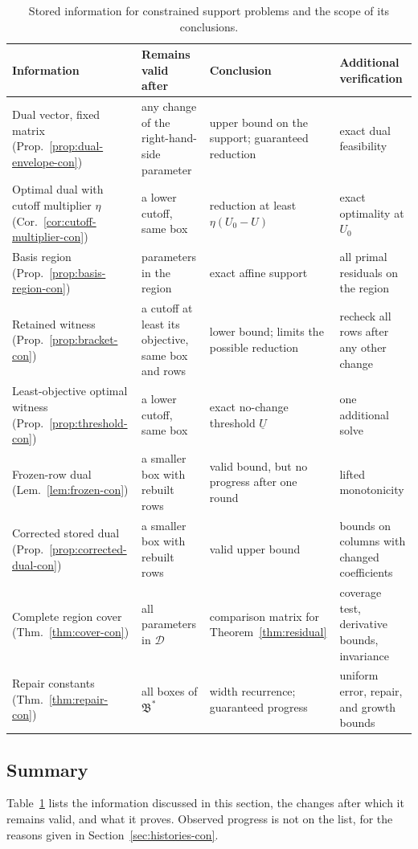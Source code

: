 \begin{table}[tbp]
\centering
\small
\caption{Stored information for constrained support problems and the scope
of its conclusions.}\label{tab:scope-con}
\begin{tabular}{@{}>{\raggedright\arraybackslash}p{}%
>{\raggedright\arraybackslash}p{}%
>{\raggedright\arraybackslash}p{}%
>{\raggedright\arraybackslash}p{}@{}}
\toprule
Information & Remains valid after & Conclusion & Additional verification\\
\midrule
Dual vector, fixed matrix (Prop.~\ref{prop:dual-envelope-con}) &
 any change of the right-hand-side parameter &
 upper bound on the support; guaranteed reduction &
 exact dual feasibility\\
Optimal dual with cutoff multiplier $\eta$ (Cor.~\ref{cor:cutoff-multiplier-con}) &
 a lower cutoff, same box &
 reduction at least $\eta(U_0-U)$ &
 exact optimality at $U_0$\\
Basis region (Prop.~\ref{prop:basis-region-con}) &
 parameters in the region &
 exact affine support &
 all primal residuals on the region\\
Retained witness (Prop.~\ref{prop:bracket-con}) &
 a cutoff at least its objective, same box and rows &
 lower bound; limits the possible reduction &
 recheck all rows after any other change\\
Least-objective optimal witness (Prop.~\ref{prop:threshold-con}) &
 a lower cutoff, same box &
 exact no-change threshold $\underline U$ &
 one additional solve\\
Frozen-row dual (Lem.~\ref{lem:frozen-con}) &
 a smaller box with rebuilt rows &
 valid bound, but no progress after one round &
 lifted monotonicity\\
Corrected stored dual (Prop.~\ref{prop:corrected-dual-con}) &
 a smaller box with rebuilt rows &
 valid upper bound &
 bounds on columns with changed coefficients\\
Complete region cover (Thm.~\ref{thm:cover-con}) &
 all parameters in $\mathcal D$ &
 comparison matrix for Theorem~\ref{thm:residual} &
 coverage test, derivative bounds, invariance\\
Repair constants (Thm.~\ref{thm:repair-con}) &
 all boxes of $\mathfrak B^*$ &
 width recurrence; guaranteed progress &
 uniform error, repair, and growth bounds\\
\bottomrule
\end{tabular}
\end{table}

\subsection{Summary}\label{sec:summary-con}

Table~\ref{tab:scope-con} lists the information discussed in this section,
the changes after which it remains valid, and what it proves. Observed
progress is not on the list, for the reasons given in
Section~\ref{sec:histories-con}.
